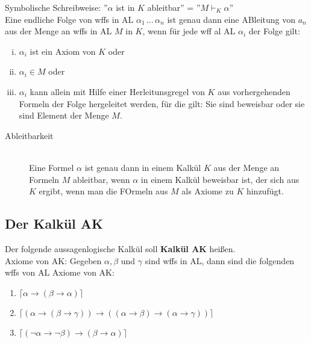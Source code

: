 \documentclass{scrartcl}
\begin{document}
Symbolische Schreibweise: ''$ \alpha $ ist in $ K $ ableitbar'' = ''$ M \vdash_K \alpha $'' \\

Eine endliche Folge von wffs in AL $ \alpha_1 \, \ldots \, \alpha_n $ ist genau dann eine ABleitung von $ a_n $ aus der Menge an wffs in AL $ M $ in $ K $, wenn für jede wff al AL $ \alpha_i $ der Folge gilt:
\begin{enumerate}[(i)]
	\item $ \alpha_i $ ist ein Axiom von $ K $ oder
	\item $ \alpha_i \in M $ oder
	\item $ \alpha_i $ kann allein mit Hilfe einer Herleitunsgregel von $ K $ aus vorhergehenden Formeln der Folge hergeleitet werden, für die gilt: Sie sind beweisbar oder sie sind Element der Menge $ M $.
\end{enumerate}

\begin{description}
	\item[Ableitbarkeit] \mbox{}\\ Eine Formel $ \alpha $ ist genau dann in einem Kalkül $ K $ aus der Menge an Formeln $ M $ ableitbar, wenn $ \alpha $ in einem Kalkül beweisbar ist, der sich aus $ K $ ergibt, wenn man die FOrmeln aus $ M $ als Axiome zu $ K $ hinzufügt.
\end{description}

\subsection{Der Kalkül AK}

Der folgende aussagenlogische Kalkül soll \textbf{Kalkül AK} heißen. \\

Axiome von AK: Gegeben $ \alpha,\beta $ und $ \gamma $ sind wffs in AL, dann sind die folgenden wffs von AL Axiome von AK:

\begin{enumerate}[({A}1)]
	\item $ \lceil \alpha \rightarrow (\beta \rightarrow \alpha) \rceil $
	\item $ \lceil (\alpha \rightarrow (\beta \rightarrow \gamma)) \rightarrow ((\alpha \rightarrow \beta) \rightarrow (\alpha \rightarrow \gamma)) \rceil $
	\item $ \lceil (\neg \alpha \rightarrow \neg \beta) \rightarrow (\beta \rightarrow \alpha) \rceil $
\end{enumerate}
\end{document}
